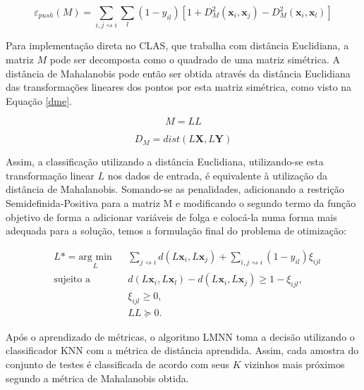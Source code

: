 \documentclass[
	12pt,				%
	openright,			%
	twoside,			%
	a4paper,			%
	english,			%
	spanish,			%
	brazil,				%
	]{abntex2}\usepackage[]{graphicx}\usepackage[]{color}
\begin{document}
\begin{equation}
\varepsilon _{push}(M) = \sum_{i,j \rightsquigarrow i}\sum_{l}(1 - y_{il})[1+D_{M}^2(\mathbf{x}_i,\mathbf{x}_j) - D_{M}^2(\mathbf{x}_i,\mathbf{x}_l)]
\label{epush}
\end{equation}

Para implementação direta no CLAS, que trabalha com distância Euclidiana, a matriz $M$ pode ser decomposta como o quadrado de uma matriz simétrica. A distância de Mahalanobis pode então ser obtida através da distância Euclidiana das transformações lineares dos pontos por esta matriz simétrica, como visto na Equação \ref{dme}.

\begin{equation}
M = LL
\label{mll}
\end{equation}

\begin{equation}
D_{M} = dist(L\mathbf{X},L\mathbf{Y})
\label{dme}
\end{equation}

Assim, a classificação utilizando a distância Euclidiana, utilizando-se esta transformação linear $L$ nos dados de entrada, é equivalente à utilização da distância de Mahalanobis. Somando-se as penalidades, adicionando a restrição Semidefinida-Positiva para a matriz M e modificando o segundo termo da função objetivo de forma a adicionar variáveis de folga e colocá-la numa forma mais adequada para a solução, temos a formulação final do problema de otimização:

\begin{equation}
\begin{aligned}
& L* = \underset{L}{\text{arg min}}
& & \sum_{j \rightsquigarrow i}d(L\mathbf{x}_i,L\mathbf{x}_j)+\sum_{i,j \rightsquigarrow i}(1 - y_{il}) \xi_{ijl}\\
& \text{sujeito a}
& & d(L\mathbf{x}_i,L\mathbf{x}_l) - d(L\mathbf{x}_i,L\mathbf{x}_j) \geq 1 - \xi_{ijl},\\
&&& \xi_{ijl} \geq 0,\\
&&& LL\succeq 0.
\end{aligned}
\label{fobj}
\end{equation}


\par Após o aprendizado de métricas, o algoritmo LMNN toma a decisão utilizando o classificador KNN com a métrica de distância aprendida. Assim, cada amostra do conjunto de testes é classificada de acordo com seus $K$ vizinhos mais próximos segundo a métrica de Mahalanobis obtida.
\end{document}
